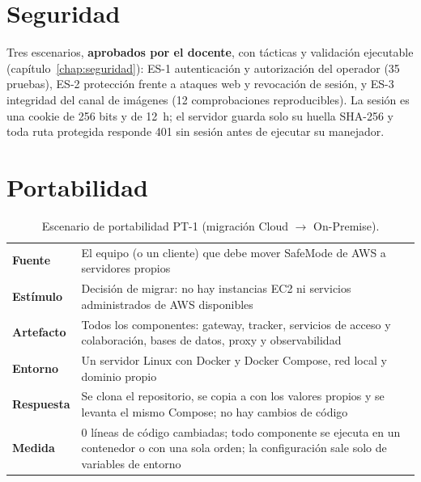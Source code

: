 \section{Seguridad}\label{sec:seguridad-resumen}
Tres escenarios, \textbf{aprobados por el docente}, con tácticas y validación ejecutable (capítulo~\ref{chap:seguridad}):
ES-1 autenticación y autorización del operador (35 pruebas), ES-2 protección frente a ataques web y revocación de sesión, y ES-3 integridad del
canal de imágenes  (12 comprobaciones reproducibles). La sesión es una cookie de 256 bits  y 
de 12~h; el servidor guarda solo su huella SHA-256 y toda ruta protegida responde 401 sin sesión antes de ejecutar su manejador.

\section{Portabilidad}\label{sec:portabilidad}

\begin{table}[H]
\centering\small
\caption{Escenario de portabilidad PT-1 (migración Cloud $\rightarrow$ On-Premise).}\label{tab:pt1}
\begin{tabularx}{\textwidth}{lY}
\toprule
\textbf{Fuente} & El equipo (o un cliente) que debe mover SafeMode de AWS a servidores propios \\
\textbf{Estímulo} & Decisión de migrar: no hay instancias EC2 ni servicios administrados de AWS disponibles \\
\textbf{Artefacto} & Todos los componentes: gateway, tracker, servicios de acceso y colaboración, bases de datos, proxy y observabilidad \\
\textbf{Entorno} & Un servidor Linux con Docker y Docker Compose, red local y dominio propio \\
\textbf{Respuesta} & Se clona el repositorio, se copia  a  con los valores propios y se levanta el mismo Compose; no hay cambios de código \\
\textbf{Medida} & 0 líneas de código cambiadas; todo componente se ejecuta en un contenedor o con una sola orden; la configuración sale solo de variables de entorno \\
\bottomrule
\end{tabularx}
\end{table}

